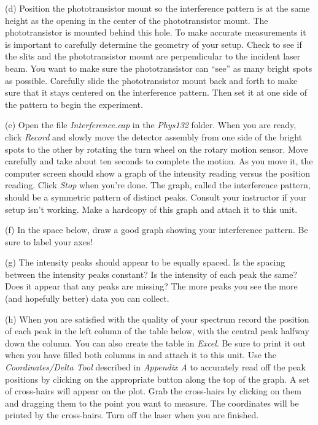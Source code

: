 (d) Position the phototransistor mount so the interference pattern
is at the same height as the opening in the center of the phototransistor mount. 
The phototransistor is mounted behind this hole. 
To make accurate measurements it is important to carefully determine the geometry of your setup. 
Check to see if the slits and the phototransistor mount are perpendicular to the incident
laser beam.  You want to make sure the phototransistor can {}``see'' as many
bright spots as possible. Carefully slide the phototransistor mount 
back and forth to make sure that it stays centered on the interference pattern. 
Then set it at one side of the pattern to begin the experiment.

(e) Open the file {\it Interference.cap} in the {\it Phys132} folder. 
When you are ready, click {\it Record} and slowly move the
detector assembly from one side of the bright spots to the other by rotating the turn wheel on the rotary motion
sensor. Move carefully and take about ten seconds to complete the motion. As you move it, the computer screen
should show a graph of the intensity reading versus the position reading. Click {\it Stop} when you’re done. The
graph, called the interference pattern, should be a symmetric pattern of distinct peaks. Consult your instructor
if your setup isn’t working.
Make a hardcopy of this graph and attach it to this unit.

(f) In the space below, draw a good graph showing your interference pattern. Be sure to label your axes!
\vspace{25mm}

(g) The intensity peaks should appear to be equally spaced. 
Is the spacing between the intensity peaks constant? Is the intensity
of each peak the same? Does it appear that any peaks are missing?
The more peaks you see the more (and hopefully better) data you can collect.
\vspace{12mm}

(h) When you are satisfied with the quality of your spectrum record the 
position of each peak in the left column of the table below, with the central 
peak halfway down the column. You can also create the table in {\it Excel}.
Be sure to print it out when you have filled both columns in and attach it to this
unit.
Use the {\it Coordinates/Delta Tool} 
described in {\it Appendix A} to accurately read off 
the peak positions by clicking on the appropriate button along the top of the 
graph. A set of cross-hairs will appear on the plot. Grab the cross-hairs by 
clicking on them and dragging them to the point you want to measure.
The coordinates will be printed by the cross-hairs.
Turn off the laser when you are finished.

